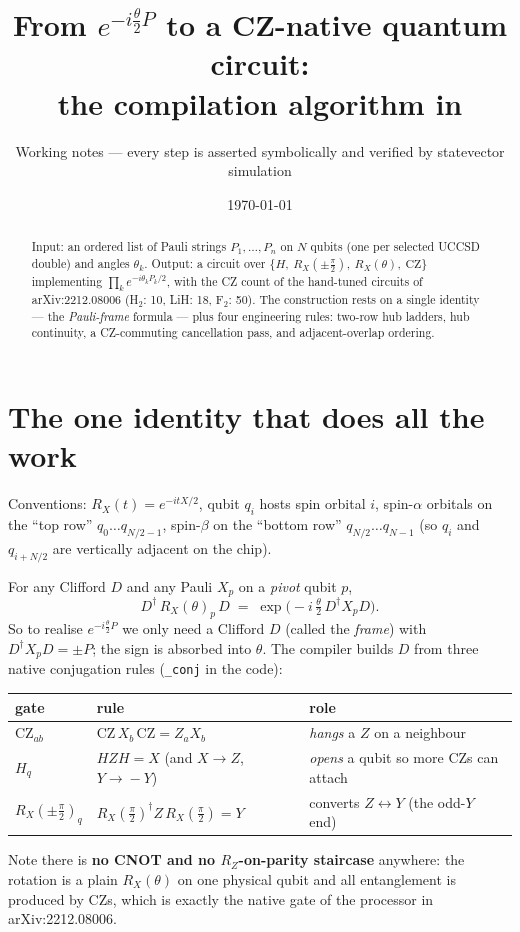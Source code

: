\documentclass[11pt]{article}
\title{From $e^{-i\frac{\theta}{2}P}$ to a CZ-native quantum circuit:\\
the compilation algorithm in \code{improved create UCCSD circuit .py}}
\author{Working notes --- every step is asserted symbolically and verified
by statevector simulation}
\date{\today}
\newcommand{\RX}{R_X}
\newcommand{\CZ}{\mathrm{CZ}}
\newcommand{\code}[1]{\texttt{#1}}
\begin{document}
\maketitle

\begin{abstract}
Input: an ordered list of Pauli strings $P_1,\dots,P_n$ on $N$ qubits
(one per selected UCCSD double) and angles $\theta_k$.
Output: a circuit over $\{H,\ \RX(\pm\tfrac{\pi}{2}),\ \RX(\theta),\ \CZ\}$
implementing $\prod_k e^{-i\theta_k P_k/2}$, with the CZ count of the
hand-tuned circuits of arXiv:2212.08006 (H$_2$: 10, LiH: 18, F$_2$: 50).
The construction rests on a single identity --- the \emph{Pauli-frame}
formula --- plus four engineering rules: two-row hub ladders, hub
continuity, a CZ-commuting cancellation pass, and adjacent-overlap
ordering.
\end{abstract}

\section{The one identity that does all the work}
Conventions: $\RX(t)=e^{-itX/2}$, qubit $q_i$ hosts spin orbital $i$,
spin-$\alpha$ orbitals on the ``top row'' $q_0\dots q_{N/2-1}$,
spin-$\beta$ on the ``bottom row'' $q_{N/2}\dots q_{N-1}$
(so $q_i$ and $q_{i+N/2}$ are vertically adjacent on the chip).

For any Clifford $D$ and any Pauli $X_p$ on a \emph{pivot} qubit $p$,
\begin{equation}
\label{eq:frame}
  D^{\dagger}\,\RX(\theta)_p\,D
  \;=\;
  \exp\!\Big(-i\,\tfrac{\theta}{2}\, D^{\dagger} X_p D\Big).
\end{equation}
So to realise $e^{-i\frac{\theta}{2}P}$ we only need a Clifford $D$
(called the \emph{frame}) with $D^{\dagger} X_p D = \pm P$; the sign is
absorbed into $\theta$. The compiler builds $D$ from three native
conjugation rules (\code{\_conj} in the code):
\begin{center}
\begin{tabular}{lll}
\toprule
gate & rule & role \\
\midrule
$\CZ_{ab}$ & $\CZ\, X_b\, \CZ = Z_a X_b$ & \emph{hangs} a $Z$ on a neighbour\\
$H_q$      & $H Z H = X$ (and $X\!\to\!Z$, $Y\!\to\!-Y$) & \emph{opens} a qubit so more CZs can attach\\
$\RX(\pm\frac{\pi}{2})_q$ & $\RX(\tfrac{\pi}{2})^{\dagger} Z\, \RX(\tfrac{\pi}{2}) = Y$ & converts $Z \leftrightarrow Y$ (the odd-$Y$ end)\\
\bottomrule
\end{tabular}
\end{center}
Note there is \textbf{no CNOT and no $R_Z$-on-parity staircase} anywhere:
the rotation is a plain $\RX(\theta)$ on one physical qubit and all
entanglement is produced by CZs, which is exactly the native gate of the
processor in arXiv:2212.08006.
\end{document}
